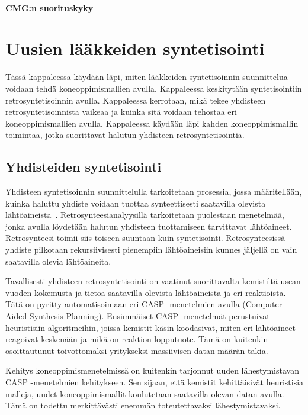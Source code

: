 \documentclass[finnish,twoside,censored,tkt,sw-line]{HYthesisML}
\begin{document}
\subsubsection{CMG:n suorituskyky}

\chapter{Uusien lääkkeiden syntetisointi}

Tässä kappaleessa käydään läpi, miten lääkkeiden syntetisoinnin suunnittelua voidaan tehdä koneoppimismallien avulla.
Kappaleessa keskitytään syntetisointiin retrosyntetisoinnin avulla.
Kappaleessa kerrotaan, mikä tekee yhdisteen retrosyntetisoinnista vaikeaa ja kuinka sitä voidaan tehostaa eri koneoppimismallien avulla.
Kappaleessa käydään läpi kahden koneoppimismallin toimintaa, jotka suorittavat halutun yhdisteen retrosyntetisointia.

\section{Yhdisteiden syntetisointi}

Yhdisteen syntetisoinnin suunnittelulla tarkoitetaan prosessia, jossa määritellään, kuinka haluttu yhdiste voidaan tuottaa synteettisesti saatavilla olevista lähtöaineista~\cite{ColeyConnorW2018MLiC}.
Retrosynteesianalyysillä tarkoitetaan puolestaan menetelmää, jonka avulla löydetään halutun yhdisteen tuottamiseen tarvittavat lähtöaineet.
Retrosynteesi toimii siis toiseen suuntaan kuin syntetisointi.
Retrosynteesissä yhdiste pilkotaan rekursiivisesti pienempiin lähtöaineisiin kunnes jäljellä on vain saatavilla olevia lähtöaineita.

Tavallisesti yhdisteen retrosyntetisointi on vaatinut suorittavalta kemistiltä usean vuoden kokemusta ja tietoa saatavilla olevista lähtöaineista ja eri reaktioista.
Tätä on pyritty automatisoimaan eri CASP -menetelmien avulla (Computer-Aided Synthesis Planning).
Ensimmäiset CASP -menetelmät perustuivat heuristisiin algoritmeihin, joissa kemistit käsin koodasivat, miten eri lähtöaineet reagoivat keskenään ja mikä on reaktion lopputuote.
Tämä on kuitenkin osoittautunut toivottomaksi yritykseksi massiivisen datan määrän takia.

Kehitys koneoppimismenetelmissä on kuitenkin tarjonnut uuden lähestymistavan CASP -menetelmien kehitykseen.
Sen sijaan, että kemistit kehittäisivät heuristisia malleja, uudet koneoppimismallit koulutetaan saatavilla olevan datan avulla.
Tämä on todettu merkittävästi enemmän toteutettavaksi lähestymistavaksi.
\end{document}
